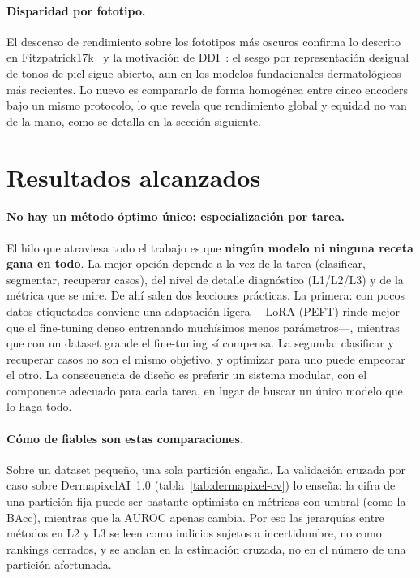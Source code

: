 \paragraph{Disparidad por fototipo.} El descenso de rendimiento sobre
los fototipos más oscuros confirma lo descrito en
Fitzpatrick17k~\cite{fitzpatrick17k} y la motivación de DDI~\cite{ddi}:
el sesgo por representación desigual de tonos de piel sigue abierto, aun
en los modelos fundacionales dermatológicos más recientes. Lo nuevo es
compararlo de forma homogénea entre cinco encoders bajo un mismo
protocolo, lo que revela que rendimiento global y equidad no van de la
mano, como se detalla en la sección siguiente.

\section{Resultados alcanzados}

\paragraph{No hay un método óptimo único: especialización por tarea.}
\label{sec:disc-especializacion}
El hilo que atraviesa todo el trabajo es que \textbf{ningún modelo ni
ninguna receta gana en todo}. La mejor opción depende a la vez de la
tarea (clasificar, segmentar, recuperar casos), del nivel de detalle
diagnóstico (L1/L2/L3) y de la métrica que se mire. De ahí salen dos
lecciones prácticas. La primera: con pocos datos etiquetados conviene
una adaptación ligera ---LoRA (PEFT) rinde mejor que el fine-tuning
denso entrenando muchísimos menos parámetros---, mientras que con un
dataset grande el fine-tuning sí compensa.\label{sec:disc-lp-vs-ft} La
segunda: clasificar y recuperar casos no son el mismo objetivo, y
optimizar para uno puede empeorar el otro. La consecuencia de
diseño es preferir un sistema modular, con el componente adecuado para
cada tarea, en lugar de buscar un único modelo que lo haga todo.

\paragraph{Cómo de fiables son estas comparaciones.}
\label{sec:disc-cv-robustez}
Sobre un dataset pequeño, una sola partición engaña. La validación
cruzada por caso sobre DermapixelAI~1.0 (tabla~\ref{tab:dermapixel-cv})
lo enseña: la cifra de una partición fija puede ser bastante optimista en
métricas con umbral (como la BAcc), mientras que la AUROC apenas cambia.
Por eso las jerarquías entre métodos en L2 y L3 se leen como indicios
sujetos a incertidumbre, no como rankings cerrados, y se anclan en la
estimación cruzada, no en el número de una partición afortunada.

